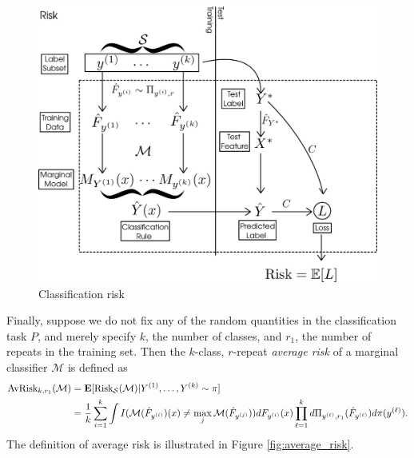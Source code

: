 \begin{figure}[h]
\centering
\includegraphics[scale = 0.3]{../extrapolation_figures/risk.png}
\caption{Classification risk}\label{fig:risk}
\end{figure}

Finally, suppose we do not fix any of the random quantities in the
classification task $P$, and merely specify $k$, the number of
classes, and $r_1$, the number of repeats in the training set.  
Then the $k$-class, $r$-repeat \emph{average risk} of
a marginal classifier $\mathcal{M}$ is defined as
\begin{align*}
\text{AvRisk}_{k,r_1}(\mathcal{M}) &= \textbf{E}[\text{Risk}_{\mathcal{S}}(\mathcal{M})|Y^{(1)}, \hdots, Y^{(k)} \sim \pi]
\\&= \frac{1}{k} \sum_{i=1}^k \int
I(\mathcal{M}(\hat{F}_{y^{(i)}})(x) \neq \max_j
\mathcal{M}(\hat{F}_{y^{(j)}})) dF_{y^{(i)}}(x) \prod_{\ell=1}^k
d\Pi_{y^{(\ell)}, r_1}(\hat{F}_{y^{(\ell)}}) d\pi(y^{(\ell)}).
\end{align*}
The definition of average risk is illustrated in Figure \ref{fig:average_risk}.

